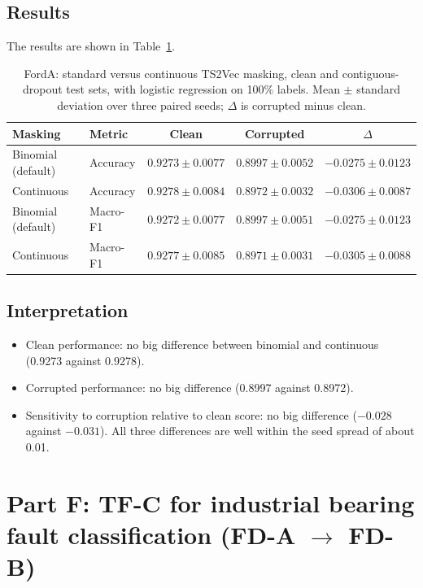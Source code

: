 \documentclass[a4paper,11pt]{article}
\begin{document}
\subsection{Results}
The results are shown in Table~\ref{tab:masking-ablation}.

\begin{table}[htbp]
    \centering
    \small
    \begin{tabular}{l l c c c}
        \toprule
        Masking & Metric & Clean & Corrupted & $\Delta$ \\
        \midrule
        Binomial (default) & Accuracy & $0.9273 \pm 0.0077$ & $0.8997 \pm 0.0052$ & $-0.0275 \pm 0.0123$ \\
        Continuous         & Accuracy & $0.9278 \pm 0.0084$ & $0.8972 \pm 0.0032$ & $-0.0306 \pm 0.0087$ \\
        \midrule
        Binomial (default) & Macro-F1 & $0.9272 \pm 0.0077$ & $0.8997 \pm 0.0051$ & $-0.0275 \pm 0.0123$ \\
        Continuous         & Macro-F1 & $0.9277 \pm 0.0085$ & $0.8971 \pm 0.0031$ & $-0.0305 \pm 0.0088$ \\
        \bottomrule
    \end{tabular}
    \caption{FordA: standard versus continuous TS2Vec masking, clean and contiguous-dropout test sets, with logistic regression on 100\% labels. Mean $\pm$ standard deviation over three paired seeds; $\Delta$ is corrupted minus clean.}
    \label{tab:masking-ablation}
\end{table}

\subsection{Interpretation}
\begin{itemize}
\item Clean performance: no big difference between binomial and continuous (0.9273 against 0.9278).
\item Corrupted performance: no big difference (0.8997 against 0.8972).
\item Sensitivity to corruption relative to clean score: no big difference ($-0.028$ against $-0.031$). All three differences are well within the seed spread of about 0.01.
\end{itemize}

\section{Part F: TF-C for industrial bearing fault classification (\texorpdfstring{FD-A $\rightarrow$ FD-B}{FD-A to FD-B})}
\end{document}
